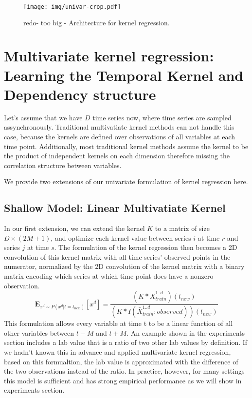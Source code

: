 \documentclass{article} %
\begin{document}
\begin{figure}[h]
\begin{center}
\texttt{[image: img/univar-crop.pdf]}
\end{center}
\caption{redo- too big - Architecture for kernel regression.}\label{fig:arch}
\end{figure}

\section{Multivariate kernel regression: Learning the Temporal Kernel and Dependency structure}

Let's assume that we have $D$ time series now, where time series are sampled assynchronously. Traditional multivatiate kernel methods can not handle this case, because the kernels are defined over observations of all variables at each time point. Additionally, most traditional kernel methods assume the kernel to be the product of independent kernels on each dimension therefore missing the correlation structure between variables.

We provide two extensions of our univariate formulation of kernel regression here. 

\subsection{Shallow Model: Linear Multivatiate Kernel}
In our first extension, we can extend the kernel $K$ to a matrix of size $D \times (2M+1)$, and optimize each kernel value between series $i$ at time $r$ and series $j$ at time $s$. The formulation of the kernel regression then becomes a 2D convolution of this kernel matrix with all time series' observed points in the numerator, normalized by the 2D convolution of the kernel matrix with a binary matrix encoding which series at which time point does have a nonzero observation. 
% 
$$ \mathbf{E}_{x^d \sim P(x^d|t=t_{new})}[x^d] = \frac{(K \ast \bar X^{1..d}_{train})(t_{new})}{(K \ast I(\bar X^{1..d}_{train} :observed)) (t_{new})} $$
% 
This formulation allows every variable at time t to be a linear function of all other variables between $t-M$ and $t+M$. An example shown in the experiments section includes a lab value that is a ratio of two other lab values by definition. If we hadn't known this in advance and applied multivariate kernel regression, based on this formualtion, the lab value is approximated with the difference of the two observations instead of the ratio. In practice, however, for many settings this model is sufficient and has strong empirical performance as we will show in experiments section.
\end{document}
